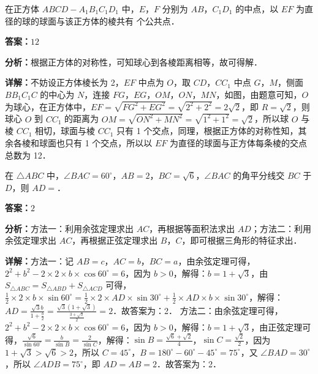 \begin{question}[points=5]
在正方体 $ABCD-A_1B_1C_1D_1$ 中，$E$，$F$ 分别为 $AB$，$C_1D_1$ 的中点，以 $EF$ 为直径的球的球面与该正方体的棱共有  个公共点．
\fillin[{$12$}]
\begin{solution}
\textbf{答案：}$12$

\textbf{分析：}根据正方体的对称性，可知球心到各棱距离相等，故可得解．

\textbf{详解：}不妨设正方体棱长为 2，$EF$ 中点为 $O$，取 $CD$，$CC_1$ 中点 $G$，$M$，侧面 $BB_1C_1C$ 的中心为 $N$，连接 $FG$，$EG$，$OM$，$ON$，$MN$，如图，由题意可知，$O$ 为球心，在正方体中，$EF = \sqrt{FG^2+EG^2} = \sqrt{2^2+2^2} = 2\sqrt{2}$，即 $R=\sqrt{2}$，则球心 $O$ 到 $CC_1$ 的距离为 $OM = \sqrt{ON^2+MN^2} = \sqrt{1^2+1^2} = \sqrt{2}$，所以球 $O$ 与棱 $CC_1$ 相切，球面与棱 $CC_1$ 只有 1 个交点，同理，根据正方体的对称性知，其余各棱和球面也只有 1 个交点，所以以 $EF$ 为直径的球面与正方体每条棱的交点总数为 12．
\end{solution}
\end{question}

\begin{question}[points=5]
在 $\triangle ABC$ 中，$\angle BAC = 60^\circ$，$AB = 2$，$BC = \sqrt{6}$，$\angle BAC$ 的角平分线交 $BC$ 于 $D$，则 $AD = $．
\fillin[{$2$}]
\begin{solution}
\textbf{答案：}$2$

\textbf{分析：}方法一：利用余弦定理求出 $AC$，再根据等面积法求出 $AD$；方法二：利用余弦定理求出 $AC$，再根据正弦定理求出 $B$，$C$，即可根据三角形的特征求出．

\textbf{详解：}方法一：记 $AB=c$，$AC=b$，$BC=a$，由余弦定理可得，$2^2+b^2-2\times2\times b\times\cos60^\circ = 6$，因为 $b>0$，解得：$b=1+\sqrt{3}$，由 $S_{\triangle ABC} = S_{\triangle ABD} + S_{\triangle ACD}$ 可得，$\frac{1}{2}\times2\times b\times\sin60^\circ = \frac{1}{2}\times2\times AD\times\sin30^\circ + \frac{1}{2}\times AD\times b\times\sin30^\circ$，解得：$AD = \frac{\sqrt{3}b}{1+\frac{b}{2}} = \frac{\sqrt{3}(1+\sqrt{3})}{\frac{3+\sqrt{3}}{2}} = 2$．故答案为：2．
方法二：由余弦定理可得，$2^2+b^2-2\times2\times b\times\cos60^\circ = 6$，因为 $b>0$，解得：$b=1+\sqrt{3}$，由正弦定理可得，$\frac{\sqrt{6}}{\sin60^\circ} = \frac{b}{\sin B} = \frac{2}{\sin C}$，解得：$\sin B = \frac{\sqrt{6}+\sqrt{2}}{4}$，$\sin C = \frac{\sqrt{2}}{2}$，因为 $1+\sqrt{3} > \sqrt{6} > 2$，所以 $C=45^\circ$，$B=180^\circ-60^\circ-45^\circ=75^\circ$，又 $\angle BAD = 30^\circ$，所以 $\angle ADB = 75^\circ$，即 $AD = AB = 2$．故答案为：2．
\end{solution}
\end{question}

